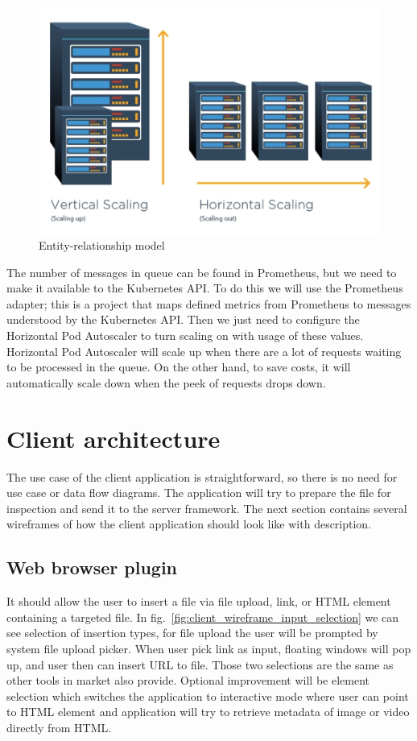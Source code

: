 \begin{figure}[H]
    \centering
    \includegraphics[width=.675\linewidth]{other-fig/scaling.png}
    \caption{Entity-relationship model}
\label{fig:scaling}
\end{figure}

The number of messages in queue can be found in Prometheus, but we need to make it available to the Kubernetes API. To do this we will use the Prometheus adapter; this is a project that maps defined metrics from Prometheus to messages understood by the Kubernetes API. Then we just need to configure the Horizontal Pod Autoscaler to turn scaling on with usage of these values. Horizontal Pod Autoscaler will scale up when there are a lot of requests waiting to be processed in the queue. On the other hand, to save costs, it will automatically scale down when the peek of requests drops down.

\chapter{Client architecture}

The use case of the client application is straightforward, so there is no need for use case or data flow diagrams. The application will try to prepare the file for inspection and send it to the server framework. The next section contains several wireframes of how the client application should look like with description.

\section{Web browser plugin}

It should allow the user to insert a file via file upload, link, or HTML element containing a targeted file. In fig.~\ref{fig:client_wireframe_input_selection} we can see selection of insertion types, for file upload the user will be prompted by system file upload picker. When user pick link as input, floating windows will pop up, and user then can insert URL to file. Those two selections are the same as other tools in market also provide. Optional improvement will be element selection which switches the application to interactive mode where user can point to HTML element and application will try to retrieve metadata of image or video directly from HTML. 

